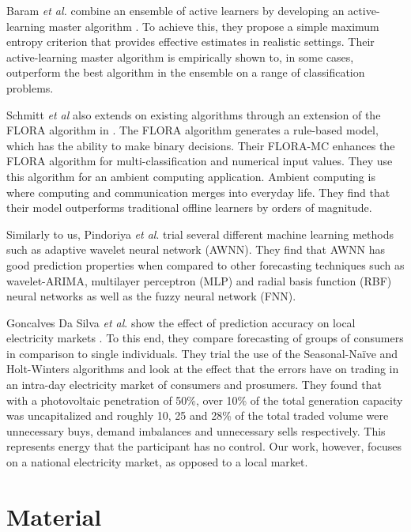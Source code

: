 \documentclass[final,3p,times,twocolumn,numbers]{elsarticle}
\begin{document}
Baram \textit{et al.} combine an ensemble of active learners by developing an active-learning master algorithm \cite{Baram2003}. To achieve this, they propose a simple maximum entropy criterion that provides effective estimates in realistic settings. Their active-learning master algorithm is empirically shown to, in some cases, outperform the best algorithm in the ensemble on a range of classification problems.

Schmitt \textit{et al} also extends on existing algorithms through an extension of the FLORA algorithm in \cite{Schmitt2008, Widmer1996}. The FLORA algorithm generates a rule-based model, which has the ability to make binary decisions. Their FLORA-MC enhances the FLORA algorithm for multi-classification and numerical input values. They use this algorithm for an ambient computing application. Ambient computing is where computing and communication merges into everyday life. They find that their model outperforms traditional offline learners by orders of magnitude.

Similarly to us, Pindoriya \textit{et al}. trial several different machine learning methods such as adaptive wavelet neural network (AWNN). They find that AWNN has good prediction properties when compared to other forecasting techniques such as wavelet-ARIMA, multilayer perceptron (MLP) and radial basis function (RBF) neural networks as well as the fuzzy neural network (FNN).


Goncalves Da Silva \textit{et al}. show the effect of prediction accuracy on local electricity markets \cite{GoncalvesDaSilva2014}. To this end, they compare forecasting of groups of consumers in comparison to single individuals. They trial the use of the Seasonal-Naïve and Holt-Winters algorithms and look at the effect that the errors have on trading in an intra-day electricity market of consumers and prosumers. They found that with a photovoltaic penetration of 50\%, over 10\% of the total generation capacity was uncapitalized and roughly 10, 25 and 28\% of the total traded volume were unnecessary buys, demand imbalances and unnecessary sells respectively. This represents energy that the participant has no control. Our work, however, focuses on a national electricity market, as opposed to a local market.



\section{Material}
\label{sec:material}
\end{document}
